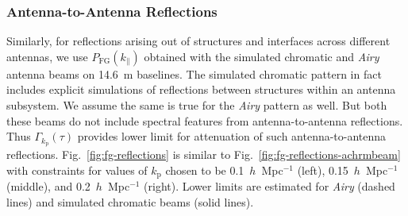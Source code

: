\documentclass[preprint2,iop,numberedappendix,twocolappendix,appendixfloats]{emulateapj}
\begin{document}
\subsubsection{Antenna-to-Antenna Reflections}\label{sec:antenna-antenna-reflections}

Similarly, for reflections arising out of structures and interfaces across different antennas, we use $P_\textrm{FG}(k_\parallel)$ obtained with the simulated chromatic and {\it Airy} antenna beams on 14.6~m baselines. The simulated chromatic pattern in fact includes explicit simulations of reflections between structures within an antenna subsystem. We assume the same is true for the {\it Airy} pattern as well. But both these beams do not include spectral features from antenna-to-antenna reflections. Thus $\Gamma_{k_\textrm{p}}(\tau)$ provides lower limit for attenuation of such antenna-to-antenna reflections. Fig.~\ref{fig:fg-reflections} is similar to Fig.~\ref{fig:fg-reflections-achrmbeam} with constraints for values of $k_\textrm{p}$ chosen to be 0.1~$h$~Mpc$^{-1}$ (left), 0.15~$h$~Mpc$^{-1}$ (middle), and 0.2~$h$~Mpc$^{-1}$ (right). Lower limits are estimated for {\it Airy} (dashed lines) and simulated chromatic beams (solid lines).
\end{document}
